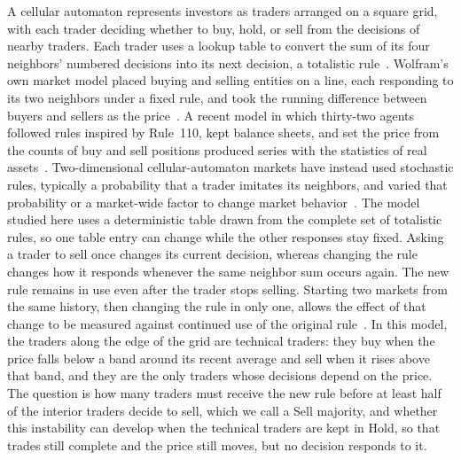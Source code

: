 A cellular automaton represents investors as traders arranged on a square
grid, with each trader deciding whether to buy, hold, or sell from the
decisions of nearby traders. Each trader uses a lookup table to convert the
sum of its four neighbors' numbered decisions into its next decision, a
totalistic rule~\cite{wolfram1984universality,packard1985two,wolfram2002new}.
Wolfram's own market model placed buying and selling entities on a line,
each responding to its two neighbors under a fixed rule, and took the
running difference between buyers and sellers as the
price~\cite{wolfram2002new}. A recent model in which thirty-two agents
followed rules inspired by Rule~110, kept balance sheets, and set the price
from the counts of buy and sell positions produced series with the
statistics of real assets~\cite{valsan2022on}. Two-dimensional
cellular-automaton markets have instead used stochastic rules, typically a
probability that a trader imitates its neighbors, and varied that
probability or a market-wide factor to change market
behavior~\cite{wei2003cellular,bartolozzi2004stochastic,qiu2007cellular,fan2009effect,atman2012influence}.
The model studied here uses a deterministic table drawn from the complete
set of totalistic rules, so one table entry can change while the other
responses stay fixed. Asking a trader to sell once changes its current decision, whereas
changing the rule changes how it responds whenever the same neighbor sum
occurs again. The new rule remains in use even after the trader stops
selling. Starting two markets from the same history, then changing the rule
in only one, allows the effect of that change to be measured against
continued use of the original
rule~\cite{glasserman1992guidelines,law2015simulation}.
In this model, the traders along the edge of the grid are
technical traders: they buy when the price falls below a band around its
recent average and sell when it rises above that band, and they are the only
traders whose decisions depend on the price. The question is how
many traders must receive the new rule before at least half of the interior
traders decide to sell, which we call a Sell majority, and whether this
instability can develop when the technical traders are kept in Hold, so that
trades still complete and the price still moves, but no decision responds to
it.

